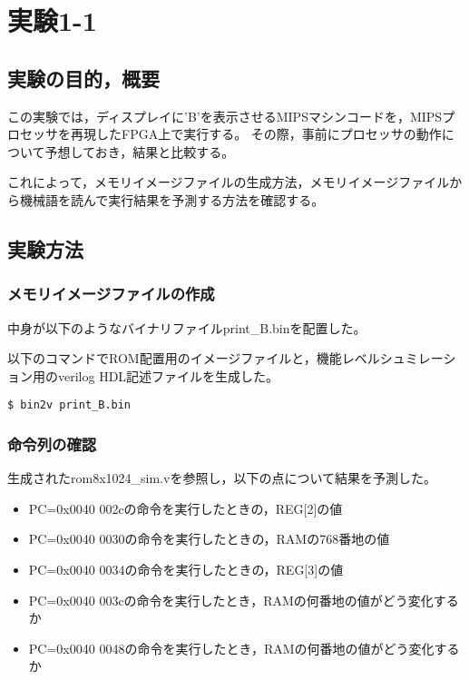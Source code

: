 
\section{実験1-1}
\subsection{実験の目的，概要}
この実験では，ディスプレイに'B'を表示させるMIPSマシンコードを，MIPSプロセッサを再現したFPGA上で実行する。
その際，事前にプロセッサの動作について予想しておき，結果と比較する。

これによって，メモリイメージファイルの生成方法，メモリイメージファイルから機械語を読んで実行結果を予測する方法を確認する。

\subsection{実験方法}
\subsubsection{メモリイメージファイルの作成}
中身が以下のようなバイナリファイルprint\_B.binを配置した。


以下のコマンドでROM配置用のイメージファイルと，機能レベルシュミレーション用のverilog HDL記述ファイルを生成した。
\begin{lstlisting}[caption={イメージファイルの作成},label={イメージファイルの作成1-1}]
  $ bin2v print_B.bin
\end{lstlisting}

\subsubsection{命令列の確認}
生成されたrom8x1024\_sim.vを参照し，以下の点について結果を予測した。
\begin{itemize}
  \item PC=0x0040 002cの命令を実行したときの，REG[2]の値
  \item PC=0x0040 0030の命令を実行したときの，RAMの768番地の値
  \item PC=0x0040 0034の命令を実行したときの，REG[3]の値
  \item PC=0x0040 003cの命令を実行したとき，RAMの何番地の値がどう変化するか
  \item PC=0x0040 0048の命令を実行したとき，RAMの何番地の値がどう変化するか
\end{itemize}

